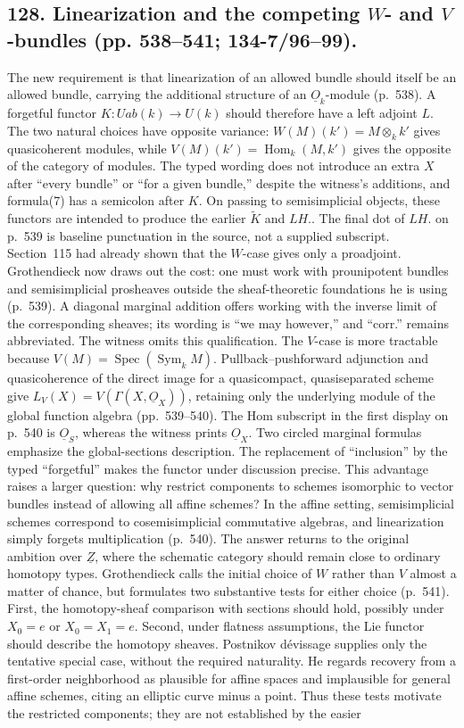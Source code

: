 \documentclass[10pt,oneside]{book}
\begin{document}
\subsection*{128. Linearization and the competing $W$- and $V$-bundles (pp. 538--541; 134-7/96--99).}
The new requirement is that linearization of an allowed bundle should itself be an allowed bundle, carrying the additional structure of an $\underline O_k$-module (p.~538). A forgetful functor $K:Uab(k)\to U(k)$ should therefore have a left adjoint $L$. The two natural choices have opposite variance: $W(M)(k')=M\otimes_k k'$ gives quasicoherent modules, while $V(M)(k')=\operatorname{Hom}_k(M,k')$ gives the opposite of the category of modules. The typed wording does not introduce an extra $X$ after ``every bundle'' or ``for a given bundle,'' despite the witness's additions, and formula(7) has a semicolon after $K$. On passing to semisimplicial objects, these functors are intended to produce the earlier $\widetilde K$ and $LH.$. The final dot of $LH.$ on p.~539 is baseline punctuation in the source, not a supplied subscript. Section~115 had already shown that the $W$-case gives only a proadjoint. Grothendieck now draws out the cost: one must work with prounipotent bundles and semisimplicial prosheaves outside the sheaf-theoretic foundations he is using (p.~539). A diagonal marginal addition offers working with the inverse limit of the corresponding sheaves; its wording is ``we may however,'' and ``corr.'' remains abbreviated. The witness omits this qualification. The $V$-case is more tractable because $V(M)=\operatorname{Spec}(\operatorname{Sym}_kM)$. Pullback--pushforward adjunction and quasicoherence of the direct image for a quasicompact, quasiseparated scheme give $L_V(X)=V(\Gamma(X,\underline O_X))$, retaining only the underlying module of the global function algebra (pp.~539--540). The Hom subscript in the first display on p.~540 is $\underline O_S$, whereas the witness prints $\underline O_X$. Two circled marginal formulas emphasize the global-sections description. The replacement of ``inclusion'' by the typed ``forgetful'' makes the functor under discussion precise. This advantage raises a larger question: why restrict components to schemes isomorphic to vector bundles instead of allowing all affine schemes? In the affine setting, semisimplicial schemes correspond to cosemisimplicial commutative algebras, and linearization simply forgets multiplication (p.~540). The answer returns to the original ambition over $\underline Z$, where the schematic category should remain close to ordinary homotopy types. Grothendieck calls the initial choice of $W$ rather than $V$ almost a matter of chance, but formulates two substantive tests for either choice (p.~541). First, the homotopy-sheaf comparison with sections should hold, possibly under $X_0=e$ or $X_0=X_1=e$. Second, under flatness assumptions, the Lie functor should describe the homotopy sheaves. Postnikov d\'evissage supplies only the tentative special case, without the required naturality. He regards recovery from a first-order neighborhood as plausible for affine spaces and implausible for general affine schemes, citing an elliptic curve minus a point. Thus these tests motivate the restricted components; they are not established by the easier 
\end{document}
